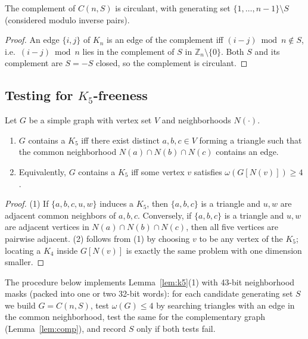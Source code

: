 \documentclass[11pt]{article}
\theoremstyle{remark}
\begin{document}
\begin{lemma}[Complement]\label{lem:comp}
The complement of $C(n,S)$ is circulant, with generating set
$\{1,\dots,n-1\}\setminus S$ (considered modulo inverse pairs).
\end{lemma}
\begin{proof}
An edge $\{i,j\}$ of $K_n$ is an edge of the complement iff $(i-j)\bmod n\notin S$, i.e.\
$(i-j)\bmod n$ lies in the complement of $S$ in $\mathbb{Z}_n\setminus\{0\}$. Both $S$ and
its complement are $S=-S$ closed, so the complement is circulant.
\end{proof}

\subsection{Testing for $K_5$-freeness}\label{sec:k5test}
\begin{lemma}\label{lem:k5}
Let $G$ be a simple graph with vertex set $V$ and neighborhoods $N(\cdot)$.
\begin{enumerate}
\item $G$ contains a $K_5$ iff there exist distinct $a,b,c\in V$ forming a triangle such
that the common neighborhood $N(a)\cap N(b)\cap N(c)$ contains an edge.
\item Equivalently, $G$ contains a $K_5$ iff some vertex $v$ satisfies $\omega(G[N(v)]) \ge 4$.
\end{enumerate}
\end{lemma}
\begin{proof}
(1) If $\{a,b,c,u,w\}$ induces a $K_5$, then $\{a,b,c\}$ is a triangle and $u,w$ are
adjacent common neighbors of $a,b,c$. Conversely, if $\{a,b,c\}$ is a triangle and $u,w$
are adjacent vertices in $N(a)\cap N(b)\cap N(c)$, then all five vertices are pairwise
adjacent. (2) follows from (1) by choosing $v$ to be any vertex of the $K_5$; locating a
$K_4$ inside $G[N(v)]$ is exactly the same problem with one dimension smaller.
\end{proof}

The procedure below implements Lemma~\ref{lem:k5}(1) with 43-bit neighborhood masks
(packed into one or two 32-bit words): for each candidate generating set $S$ we build
$G=C(n,S)$, test $\omega(G)\le4$ by searching triangles with an edge in the common
neighborhood, test the same for the complementary graph (Lemma~\ref{lem:comp}), and record
$S$ only if both tests fail.
\end{document}
